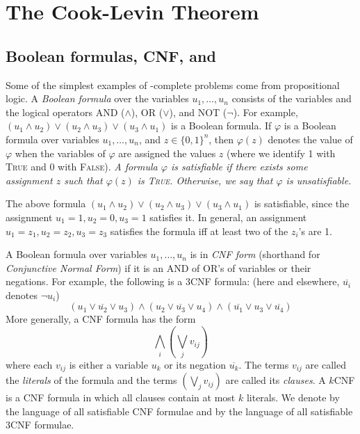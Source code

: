 \section{The Cook-Levin Theorem}

\subsection*{Boolean formulas, CNF, and \SAT}

Some of the simplest examples of \NP-complete problems come from propositional logic. A \emph{Boolean formula} over the variables $u_1,\ldots,u_n$ consists of the variables and the logical operators AND ($\wedge$), OR ($\vee$), and NOT ($\neg$). For example, $(u_1 \wedge u_2) \vee (u_2 \wedge u_3) \vee (u_3 \wedge u_1)$ is a Boolean formula. If $\varphi$ is a Boolean formula over variables $u_1,\ldots,u_n$, and $z \in \{0,1\}^n$, then $\varphi(z)$ denotes the value of $\varphi$ when the variables of $\varphi$ are assigned the values $z$ (where we identify 1 with \textsc{True} and 0 with \textsc{False}). \emph{A formula $\varphi$ is satisfiable if there exists some assignment $z$ such that $\varphi(z)$ is \textsc{True}. Otherwise, we say that $\varphi$ is unsatisfiable.}

The above formula $(u_1 \wedge u_2) \vee (u_2 \wedge u_3) \vee (u_3 \wedge u_1)$ is satisfiable, since the assignment $u_1 = 1, u_2 = 0, u_3 = 1$ satisfies it. In general, an assignment $u_1 = z_1, u_2 = z_2, u_3 = z_3$ satisfies the formula iff at least two of the $z_i$'s are 1.

A Boolean formula over variables $u_1,\ldots,u_n$ is in \emph{CNF form} (shorthand for \emph{Conjunctive Normal Form}) if it is an AND of OR's of variables or their negations. For example, the following is a 3CNF formula: (here and elsewhere, $\overline{u_i}$ denotes $\neg u_i$)
\[
	(u_1 \vee \overline{u_2} \vee u_3) \wedge (u_2 \vee \overline{u_3} \vee u_4) \wedge (\overline{u_1} \vee u_3 \vee \overline{u_4})
\]
More generally, a CNF formula has the form
\[
	\bigwedge_i \left(\bigvee_j v_{ij}\right)
\]
where each $v_{ij}$ is either a variable $u_k$ or its negation $\overline{u_k}$. The terms $v_{ij}$ are called the \emph{literals} of the formula and the terms $(\bigvee_j v_{ij})$ are called its \emph{clauses}. A $k$CNF is a CNF formula in which all clauses contain at most $k$ literals. We denote by \SAT the language of all satisfiable CNF formulae and by  the language of all satisfiable 3CNF formulae.


